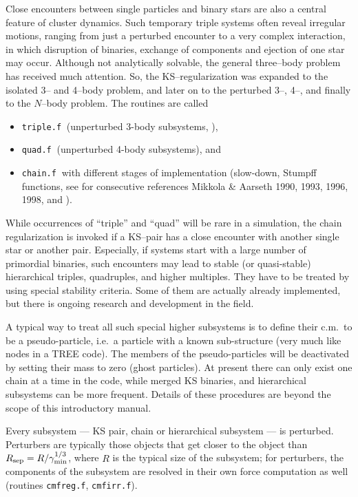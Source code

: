 Close encounters between single particles and binary stars are
also a central feature of cluster dynamics.
Such temporary triple systems often reveal irregular motions, 
ranging from just a perturbed encounter to a very complex interaction,
in which disruption of binaries, exchange of components and ejection
of one star may occur.
Although not analytically solvable, the general three--body problem
has received much attention.
So, the KS--regularization was expanded to the isolated 3-- and 4--body
problem, and later on to the perturbed 3--, 4--, and finally to the
$N$--body problem.
The routines are called
%
\begin{itemize}
\item {\tt triple.f}$\:$ (unperturbed 3-body subsystems, \cite{az_74}),
\item {\tt quad.f}$\:$  (unperturbed 4-body subsystems), and
\item {\tt chain.f}$\:$ with different stages of implementation
      (slow-down, Stumpff functions, see for consecutive references
      Mikkola \& Aarseth 1990, 1993, 1996, 1998, and \cite{m_97}).
\end{itemize}
%
While occurrences of ``triple'' and ``quad'' will be rare in a
simulation, the chain regularization is invoked if a KS--pair
has a  close encounter with another single star or another pair.
Especially, if systems start with a large number of primordial
binaries, such encounters may lead to stable (or quasi-stable)
hierarchical triples, quadruples, and higher multiples.
They have to be treated by using special stability criteria.
Some of them are actually already implemented, but there is ongoing
research and development in the field.

A typical way to treat all such special higher subsystems is to define
their c.m.\ to be a pseudo-particle, i.e.\ a particle with a
known sub-structure (very much like nodes in a TREE code).
The members of the pseudo-particles will be deactivated by setting
their mass to zero (ghost particles).
At present there can only exist one chain at a time in the code,
while merged KS binaries, and hierarchical subsystems can be more
frequent.
Details of these procedures are beyond the scope of this introductory
manual.

Every subsystem --- KS pair, chain or hierarchical subsystem ---
is perturbed.
Perturbers are typically those objects that get closer to the object
than $R_{\rm sep} = R/\gamma_{\rm min}^{1/3}$, where $R$ is the
typical size of the subsystem;
for perturbers, the components of the subsystem are resolved in their
own force computation as well (routines {\tt cmfreg.f}, {\tt cmfirr.f}).


